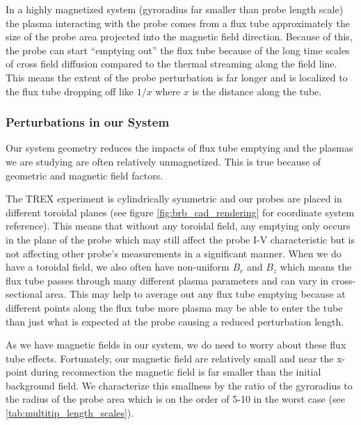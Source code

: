 
In a highly magnetized system (gyroradius far smaller than probe length scale) the plasma interacting with the probe comes from a flux tube approximately the size of the probe area projected into the magnetic field direction. Because of this, the probe can start ``emptying out'' the flux tube because of the long time scales of cross field diffusion compared to the thermal streaming along the field line. This means the extent of the probe perturbation is far longer and is localized to the flux tube dropping off like $1 / x$ where $x$ is the distance along the tube.

\subsubsection{Perturbations in our System}

Our system geometry reduces the impacts of flux tube emptying and the plasmas we are studying are often relatively unmagnetized. This is true because of geometric and magnetic field factors.

The TREX experiment is cylindrically symmetric and our probes are placed in different toroidal planes (see figure \ref{fig:brb_cad_rendering} for coordinate system reference). This means that without any toroidal field, any emptying only occurs in the plane of the probe which may still affect the probe I-V characteristic but is not affecting other probe's measurements in a significant manner. When we do have a toroidal field, we also often have non-uniform $B_r$ and $B_z$ which means the flux tube passes through many different plasma parameters and can vary in cross-sectional area. This may help to average out any flux tube emptying because at different points along the flux tube more plasma may be able to enter the tube than just what is expected at the probe causing a reduced perturbation length.

As we have magnetic fields in our system, we do need to worry about these flux tube effects. Fortunately, our magnetic field are relatively small and near the x-point during reconnection the magnetic field is far smaller than the initial background field. We characterize this smallness by the ratio of the gyroradius to the radius of the probe area which is on the order of 5-10 in the worst case (see \ref{tab:multitip_length_scales}).

